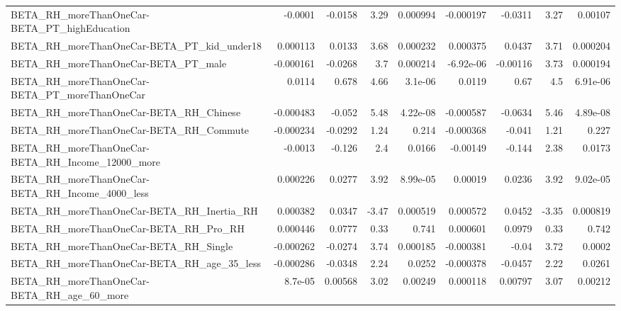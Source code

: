 \begin{tabular}{lrrrrrrrr}
BETA\_RH\_moreThanOneCar-BETA\_PT\_highEducation       &     -0.0001 &      -0.0158 &     3.29 & 0.000994 &  -0.000197 &     -0.0311 &         3.27 &       0.00107 \\
BETA\_RH\_moreThanOneCar-BETA\_PT\_kid\_under18         &    0.000113 &       0.0133 &     3.68 & 0.000232 &   0.000375 &      0.0437 &         3.71 &      0.000204 \\
BETA\_RH\_moreThanOneCar-BETA\_PT\_male                &   -0.000161 &      -0.0268 &      3.7 & 0.000214 &  -6.92e-06 &    -0.00116 &         3.73 &      0.000194 \\
BETA\_RH\_moreThanOneCar-BETA\_PT\_moreThanOneCar      &      0.0114 &        0.678 &     4.66 &  3.1e-06 &     0.0119 &        0.67 &          4.5 &      6.91e-06 \\
BETA\_RH\_moreThanOneCar-BETA\_RH\_Chinese             &   -0.000483 &       -0.052 &     5.48 & 4.22e-08 &  -0.000587 &     -0.0634 &         5.46 &      4.89e-08 \\
BETA\_RH\_moreThanOneCar-BETA\_RH\_Commute             &   -0.000234 &      -0.0292 &     1.24 &    0.214 &  -0.000368 &      -0.041 &         1.21 &         0.227 \\
BETA\_RH\_moreThanOneCar-BETA\_RH\_Income\_12000\_more   &     -0.0013 &       -0.126 &      2.4 &   0.0166 &   -0.00149 &      -0.144 &         2.38 &        0.0173 \\
BETA\_RH\_moreThanOneCar-BETA\_RH\_Income\_4000\_less    &    0.000226 &       0.0277 &     3.92 & 8.99e-05 &    0.00019 &      0.0236 &         3.92 &      9.02e-05 \\
BETA\_RH\_moreThanOneCar-BETA\_RH\_Inertia\_RH          &    0.000382 &       0.0347 &    -3.47 & 0.000519 &   0.000572 &      0.0452 &        -3.35 &      0.000819 \\
BETA\_RH\_moreThanOneCar-BETA\_RH\_Pro\_RH              &    0.000446 &       0.0777 &     0.33 &    0.741 &   0.000601 &      0.0979 &         0.33 &         0.742 \\
BETA\_RH\_moreThanOneCar-BETA\_RH\_Single              &   -0.000262 &      -0.0274 &     3.74 & 0.000185 &  -0.000381 &       -0.04 &         3.72 &        0.0002 \\
BETA\_RH\_moreThanOneCar-BETA\_RH\_age\_35\_less         &   -0.000286 &      -0.0348 &     2.24 &   0.0252 &  -0.000378 &     -0.0457 &         2.22 &        0.0261 \\
BETA\_RH\_moreThanOneCar-BETA\_RH\_age\_60\_more         &     8.7e-05 &      0.00568 &     3.02 &  0.00249 &   0.000118 &     0.00797 &         3.07 &       0.00212 \\

\end{tabular}
